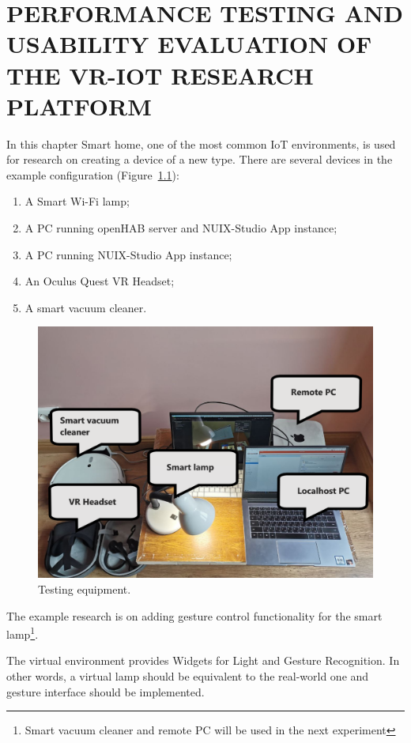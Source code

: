 
\chapter{PERFORMANCE TESTING AND USABILITY EVALUATION OF THE VR-IOT RESEARCH PLATFORM}

In this chapter Smart home, one of the most common IoT environments, is used for research on creating a device of a new type. There are several devices in the example configuration (Figure~\ref{fig:TestingEquipment-figure}):
\begin{enumerate}
    \item A Smart Wi-Fi lamp;
    \item A PC running openHAB server and NUIX-Studio App instance;
    \item A PC running NUIX-Studio App instance;
    \item An Oculus Quest VR Headset;
    \item A smart vacuum cleaner.
\end{enumerate}

\begin{figure}
  \centering
  \includegraphics[width = 0.9 \linewidth]{figures/TestingEquipment.png}
  \caption{Testing equipment.}
  \label{fig:TestingEquipment-figure}
\end{figure}

The example research is on adding gesture control functionality for the smart lamp\footnote{Smart vacuum cleaner and remote PC will be used in the next experiment}.

The virtual environment provides Widgets for Light and Gesture Recognition. In other words, a virtual lamp should be equivalent to the real-world one and gesture interface should be implemented.

